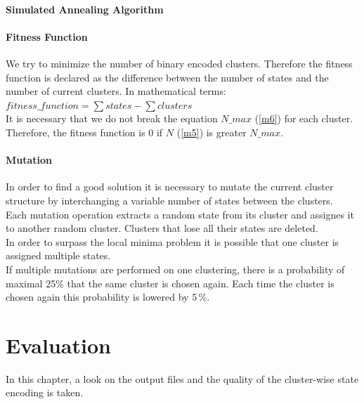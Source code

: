 \subsubsection{Simulated Annealing Algorithm}
\label{subsubsec:SAAlgorithm}



\subsubsection{Fitness Function}
\label{subsubsec:FitnessFunction}

We try to minimize the number of binary encoded clusters. Therefore the fitness function is declared as the difference between the number of states and the number of current clusters. In mathematical terms: 
$ fitness\_function = \sum{states} - \sum{clusters} $\\
It is necessary that we do not break the equation  $N\_max$ (\ref{m6}) for each cluster. Therefore, the fitness function is 0 if $ N $ (\ref{m5}) is greater $N\_max$.

\subsubsection{Mutation}
\label{subsubsec:Mutation}

In order to find a good solution it is necessary to mutate the current cluster structure by interchanging a variable number of states between the clusters. \\
Each mutation operation extracts a random state from its cluster and assignes it to another random cluster. Clusters that lose all their states are deleted. \\
In order to surpass the local minima problem it is possible that one cluster is assigned multiple states.\\
If multiple mutations are performed on one clustering, there is a probability of maximal 25\% that the same cluster is chosen again. Each time the cluster is chosen again this probability is lowered by 5\,\%.


\chapter{Evaluation}
\label{cha:Evaluation}

In this chapter, a look on the output files and the quality of the cluster-wise state encoding is taken.

